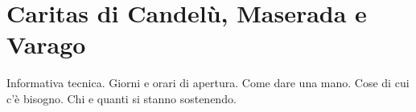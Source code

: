 \section{Caritas di Candelù, Maserada e Varago}

Informativa tecnica. Giorni e orari di apertura. Come dare una mano. Cose di cui c'è bisogno. Chi e quanti si stanno sostenendo.

\lipsum[1-3]

